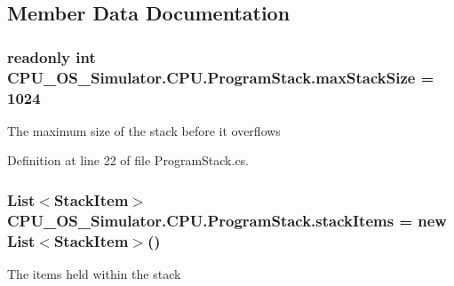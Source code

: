 \subsection{Member Data Documentation}
\hypertarget{class_c_p_u___o_s___simulator_1_1_c_p_u_1_1_program_stack_a2e475bb3c8ce48b8b0a86e31b2cb972e}{}
\subsubsection[{max\+Stack\+Size}]{\setlength{\rightskip}{0pt plus 5cm}readonly int C\+P\+U\+\_\+\+O\+S\+\_\+\+Simulator.\+C\+P\+U.\+Program\+Stack.\+max\+Stack\+Size = 1024\hspace{0.3cm}{\ttfamily [private]}}\label{class_c_p_u___o_s___simulator_1_1_c_p_u_1_1_program_stack_a2e475bb3c8ce48b8b0a86e31b2cb972e}


The maximum size of the stack before it overflows 



Definition at line 22 of file Program\+Stack.\+cs.

\hypertarget{class_c_p_u___o_s___simulator_1_1_c_p_u_1_1_program_stack_ada087487ee69e4e38e2f2591bdc28f37}{}
\subsubsection[{stack\+Items}]{\setlength{\rightskip}{0pt plus 5cm}List$<${\bf Stack\+Item}$>$ C\+P\+U\+\_\+\+O\+S\+\_\+\+Simulator.\+C\+P\+U.\+Program\+Stack.\+stack\+Items = new List$<${\bf Stack\+Item}$>$()\hspace{0.3cm}{\ttfamily [private]}}\label{class_c_p_u___o_s___simulator_1_1_c_p_u_1_1_program_stack_ada087487ee69e4e38e2f2591bdc28f37}


The items held within the stack 



